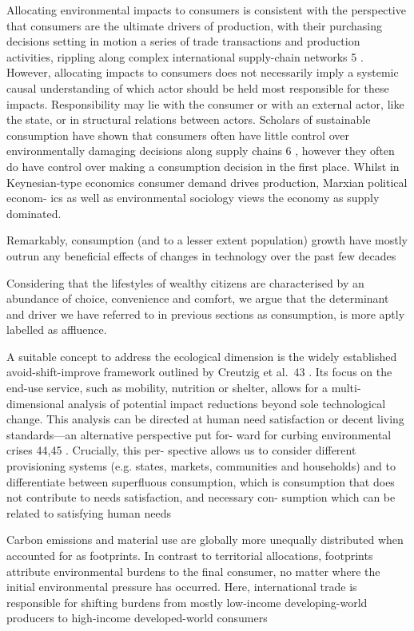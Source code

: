 \documentclass[
]{book}
\begin{document}
Allocating environmental impacts to consumers is consistent
with the perspective that consumers are the ultimate drivers of
production, with their purchasing decisions setting in motion a
series of trade transactions and production activities, rippling
along complex international supply-chain networks 5 . However,
allocating impacts to consumers does not necessarily imply a
systemic causal understanding of which actor should be held
most responsible for these impacts. Responsibility may lie with
the consumer or with an external actor, like the state, or in
structural relations between actors. Scholars of sustainable
consumption have shown that consumers often have little control
over environmentally damaging decisions along supply chains 6 ,
however they often do have control over making a consumption
decision in the first place. Whilst in Keynesian-type economics
consumer demand drives production, Marxian political econom-
ics as well as environmental sociology views the economy as
supply dominated.

Remarkably, consumption (and to a lesser extent population)
growth have mostly outrun any beneficial effects of changes in
technology over the past few decades

Considering that the lifestyles of
wealthy citizens are characterised by an abundance of choice,
convenience and comfort, we argue that the determinant and
driver we have referred to in previous sections as consumption, is
more aptly labelled as affluence.

A suitable concept to address the ecological dimension
is the widely established avoid-shift-improve framework outlined
by Creutzig et al.~43 . Its focus on the end-use service, such as
mobility, nutrition or shelter, allows for a multi-dimensional
analysis of potential impact reductions beyond sole technological
change. This analysis can be directed at human need satisfaction
or decent living standards---an alternative perspective put for-
ward for curbing environmental crises 44,45 . Crucially, this per-
spective allows us to consider different provisioning systems (e.g.
states, markets, communities and households) and to differentiate
between superfluous consumption, which is consumption that
does not contribute to needs satisfaction, and necessary con-
sumption which can be related to satisfying human needs

Carbon emissions and
material use are globally more unequally distributed when
accounted for as footprints. In contrast to territorial allocations,
footprints attribute environmental burdens to the final consumer,
no matter where the initial environmental pressure has occurred.
Here, international trade is responsible for shifting burdens from
mostly low-income developing-world producers to high-income
developed-world consumers
\end{document}
